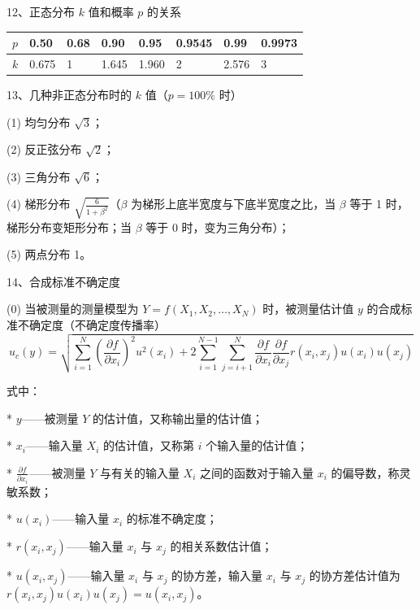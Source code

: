 \documentclass[UTF8]{ctexart}
\begin{document}
\vspace{5mm} 
12、正态分布 \(k\) 值和概率 \(p\) 的关系

\begin{table}[!ht]
    \centering
    \begin{tabular}{|l|l|l|l|l|l|l|l|}
    \hline
        \(p\) & 0.50 & 0.68 & 0.90 & 0.95 & 0.9545 & 0.99 & 0.9973 \\ \hline
        \(k\) & 0.675 & 1 & 1.645 & 1.960 & 2 & 2.576 & 3 \\ \hline
    \end{tabular}
\end{table}

\vspace{5mm} 
13、几种非正态分布时的 \(k\) 值（\(p=100\%\) 时）

(1) 均匀分布 \(\sqrt{3}\)；

(2) 反正弦分布 \(\sqrt{2}\)；

(3) 三角分布 \(\sqrt{6}\)；

(4) 梯形分布 \(\sqrt{\frac{6}{1+\beta^2}}\)（\(\beta\) 为梯形上底半宽度与下底半宽度之比，当 \(\beta\) 等于 1 时，梯形分布变矩形分布；当 \(\beta\) 等于 0 时，变为三角分布）；

(5) 两点分布 1。

\vspace{5mm} 
14、合成标准不确定度

(0) 当被测量的测量模型为 \(Y = f(X_1, X_2, \dots, X_N)\) 时，被测量估计值 \(y\) 的合成标准不确定度（不确定度传播率）
\[
u_c(y) = \sqrt{ \sum_{i=1}^{N} \left( \frac{\partial f}{\partial x_i} \right)^2 u^2(x_i) + 2 \sum_{i=1}^{N-1} \sum_{j=i+1}^{N} \frac{\partial f}{\partial x_i} \frac{\partial f}{\partial x_j} r(x_i, x_j)u(x_i)u(x_j) }
\]

式中：

*   \(y\)——被测量 \(Y\) 的估计值，又称输出量的估计值；

*   \(x_i\)——输入量 \(X_i\) 的估计值，又称第 \(i\) 个输入量的估计值；

*   \(\frac{\partial f}{\partial x_i}\)——被测量 \(Y\) 与有关的输入量 \(X_i\) 之间的函数对于输入量 \(x_i\) 的偏导数，称灵敏系数；

*   \(u(x_i)\)——输入量 \(x_i\) 的标准不确定度；

*   \(r(x_i, x_j)\)——输入量 \(x_i\) 与 \(x_j\) 的相关系数估计值；

*   \(u(x_i, x_j)\)——输入量 \(x_i\) 与 \(x_j\) 的协方差，输入量 \(x_i\) 与 \(x_j\) 的协方差估计值为 \(r(x_i, x_j)u(x_i)u(x_j) = u(x_i, x_j)\)。
\end{document}
